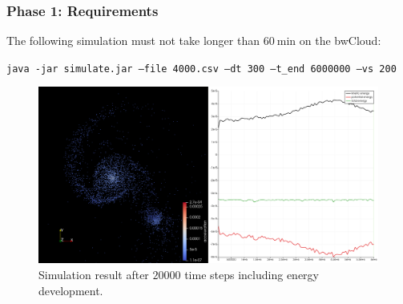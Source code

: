 \begin{frame}[fragile, label={phase1_anforderungen}]
  \frametitle{Phase 1: Requirements}
  \vspace{.5em}
  The following simulation must not take longer than $\SI{60}{\minute}$ on the bwCloud:
  \begin{center}
    \setfontsize{10.3pt}
    \texttt{java -jar simulate.jar --file 4000.csv --dt 300 --t_end 6000000 --vs 200} \\[.75em]

    \begin{figure}
        \includegraphics[width=.65\textwidth]{figures/result_phase_1.png}
        \caption{Simulation result after $\num{20000}$ time steps including energy development.}
    \end{figure}
  \end{center}
\end{frame}

